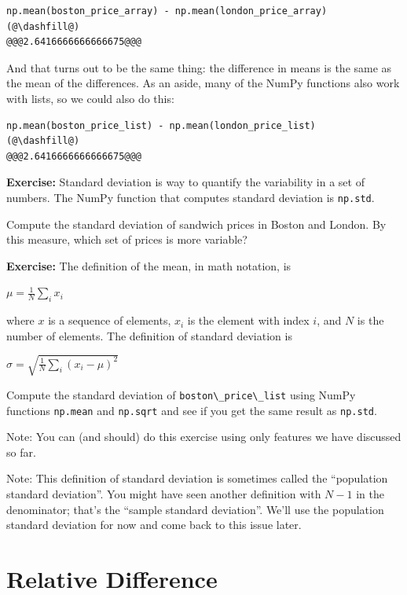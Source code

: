 \begin{lstlisting}[]
np.mean(boston_price_array) - np.mean(london_price_array)
(@\dashfill@)
@@@2.6416666666666675@@@
\end{lstlisting}

And that turns out to be the same thing: the difference in means is the
same as the mean of the differences. As an aside, many of the NumPy
functions also work with lists, so we could also do this:

\begin{lstlisting}[]
np.mean(boston_price_list) - np.mean(london_price_list)
(@\dashfill@)
@@@2.6416666666666675@@@
\end{lstlisting}

\textbf{Exercise:} Standard deviation is way to quantify the variability
in a set of numbers. The NumPy function that computes standard deviation
is \passthrough{\lstinline!np.std!}.

Compute the standard deviation of sandwich prices in Boston and London.
By this measure, which set of prices is more variable?

\textbf{Exercise:} The definition of the mean, in math notation, is

\(\mu = \frac{1}{N} \sum_i x_i\)

where \(x\) is a sequence of elements, \(x_i\) is the element with index
\(i\), and \(N\) is the number of elements. The definition of standard
deviation is

\(\sigma = \sqrt{\frac{1}{N} \sum_i (x_i - \mu)^2}\)

Compute the standard deviation of
\passthrough{\lstinline!boston\_price\_list!} using NumPy functions
\passthrough{\lstinline!np.mean!} and \passthrough{\lstinline!np.sqrt!}
and see if you get the same result as \passthrough{\lstinline!np.std!}.

Note: You can (and should) do this exercise using only features we have
discussed so far.

Note: This definition of standard deviation is sometimes called the
``population standard deviation''. You might have seen another
definition with \(N-1\) in the denominator; that's the ``sample standard
deviation''. We'll use the population standard deviation for now and
come back to this issue later.

\hypertarget{relative-difference}{%
\section{Relative Difference}\label{relative-difference}}

